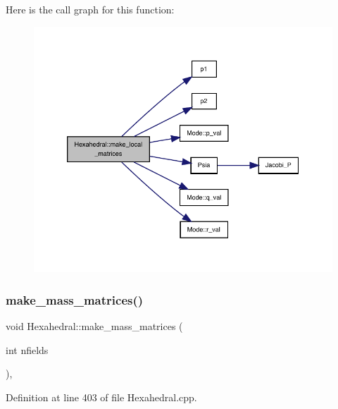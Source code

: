 Here is the call graph for this function\+:
\nopagebreak
\begin{figure}[H]
\begin{center}
\leavevmode
\includegraphics[width=350pt]{classHexahedral_a0090804316dd33890d611b294cc2df91_cgraph}
\end{center}
\end{figure}
\mbox{\label{classHexahedral_ad35eabd52192c877cc6198b14405b614}} 
\subsubsection{\texorpdfstring{make\+\_\+mass\+\_\+matrices()}{make\_mass\_matrices()}}
{\footnotesize\ttfamily void Hexahedral\+::make\+\_\+mass\+\_\+matrices (\begin{DoxyParamCaption}\item[{int}]{nfields }\end{DoxyParamCaption})\hspace{0.3cm}{\ttfamily [private]}, {\ttfamily [virtual]}}



Definition at line 403 of file Hexahedral.\+cpp.

\mbox{\label{classHexahedral_a8a25a3772962f7cb6d2f8c6b6871c0d1}} 
